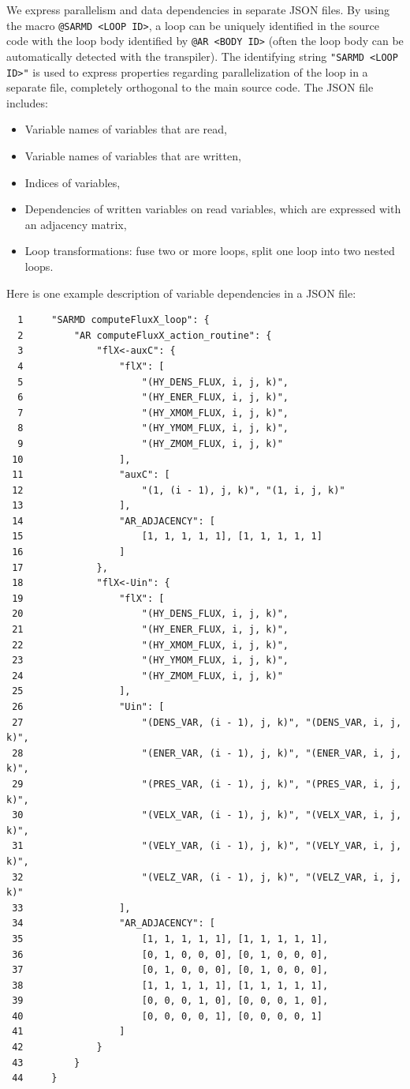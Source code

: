 \documentclass{article}
\begin{document}
We express parallelism and data dependencies in separate JSON files.  By using
the macro \texttt{@SARMD <LOOP ID>}, a loop can be uniquely identified in the
source code with the loop body identified by \texttt{@AR <BODY ID>} (often the
loop body can be automatically detected with the transpiler).  The identifying
string \texttt{"SARMD <LOOP ID>"} is used to express properties regarding
parallelization of the loop in a separate file, completely orthogonal
to the main source code.  The JSON file includes:
\begin{itemize}
  \item Variable names of variables that are read,
  \item Variable names of variables that are written,
  \item Indices of variables,
  \item Dependencies of written variables on read variables, which are
    expressed with an adjacency matrix,
  \item Loop transformations: fuse two or more loops, split one loop into two
    nested loops.
\end{itemize}
Here is one example description of variable dependencies in a JSON file:
\begin{verbatim}
  1     "SARMD computeFluxX_loop": {
  2         "AR computeFluxX_action_routine": {
  3             "flX<-auxC": {
  4                 "flX": [
  5                     "(HY_DENS_FLUX, i, j, k)",
  6                     "(HY_ENER_FLUX, i, j, k)",
  7                     "(HY_XMOM_FLUX, i, j, k)",
  8                     "(HY_YMOM_FLUX, i, j, k)",
  9                     "(HY_ZMOM_FLUX, i, j, k)"
 10                 ],
 11                 "auxC": [
 12                     "(1, (i - 1), j, k)", "(1, i, j, k)"
 13                 ],
 14                 "AR_ADJACENCY": [
 15                     [1, 1, 1, 1, 1], [1, 1, 1, 1, 1]
 16                 ]
 17             },
 18             "flX<-Uin": {
 19                 "flX": [
 20                     "(HY_DENS_FLUX, i, j, k)",
 21                     "(HY_ENER_FLUX, i, j, k)",
 22                     "(HY_XMOM_FLUX, i, j, k)",
 23                     "(HY_YMOM_FLUX, i, j, k)",
 24                     "(HY_ZMOM_FLUX, i, j, k)"
 25                 ],
 26                 "Uin": [
 27                     "(DENS_VAR, (i - 1), j, k)", "(DENS_VAR, i, j, k)",
 28                     "(ENER_VAR, (i - 1), j, k)", "(ENER_VAR, i, j, k)",
 29                     "(PRES_VAR, (i - 1), j, k)", "(PRES_VAR, i, j, k)",
 30                     "(VELX_VAR, (i - 1), j, k)", "(VELX_VAR, i, j, k)",
 31                     "(VELY_VAR, (i - 1), j, k)", "(VELY_VAR, i, j, k)",
 32                     "(VELZ_VAR, (i - 1), j, k)", "(VELZ_VAR, i, j, k)"
 33                 ],
 34                 "AR_ADJACENCY": [
 35                     [1, 1, 1, 1, 1], [1, 1, 1, 1, 1],
 36                     [0, 1, 0, 0, 0], [0, 1, 0, 0, 0],
 37                     [0, 1, 0, 0, 0], [0, 1, 0, 0, 0],
 38                     [1, 1, 1, 1, 1], [1, 1, 1, 1, 1],
 39                     [0, 0, 0, 1, 0], [0, 0, 0, 1, 0],
 40                     [0, 0, 0, 0, 1], [0, 0, 0, 0, 1]
 41                 ]
 42             }
 43         }
 44     }
\end{verbatim}
\end{document}
